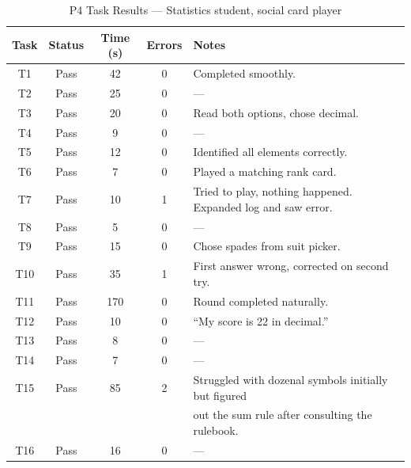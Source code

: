 \documentclass[12pt, titlepage]{article}
\begin{document}
\begin{table}[H]
\centering
\caption{P4 Task Results --- Statistics student, social card player}
\label{tab:p4-raw}
\begin{tabular}{c c c c l}
\toprule
\textbf{Task} & \textbf{Status} & \textbf{Time (s)} & \textbf{Errors} & \textbf{Notes} \\
\midrule
T1  & Pass   & 42  & 0 & Completed smoothly. \\
T2  & Pass   & 25  & 0 & --- \\
T3  & Pass   & 20  & 0 & Read both options, chose decimal. \\
T4  & Pass   & 9   & 0 & --- \\
T5  & Pass   & 12  & 0 & Identified all elements correctly. \\
T6  & Pass   & 7   & 0 & Played a matching rank card. \\
T7  & Pass   & 10  & 1 & Tried to play, nothing happened. Expanded log and saw error. \\
T8  & Pass   & 5   & 0 & --- \\
T9  & Pass   & 15  & 0 & Chose spades from suit picker. \\
T10 & Pass   & 35  & 1 & First answer wrong, corrected on second try. \\
T11 & Pass   & 170 & 0 & Round completed naturally. \\
T12 & Pass   & 10  & 0 & ``My score is 22 in decimal.'' \\
T13 & Pass   & 8   & 0 & --- \\
T14 & Pass   & 7   & 0 & --- \\
T15 & Pass   & 85  & 2 & Struggled with dozenal symbols initially but figured \\
     &        &     &   & out the sum rule after consulting the rulebook. \\
T16 & Pass   & 16  & 0 & --- \\
\bottomrule
\end{tabular}
\end{table}
\end{document}
